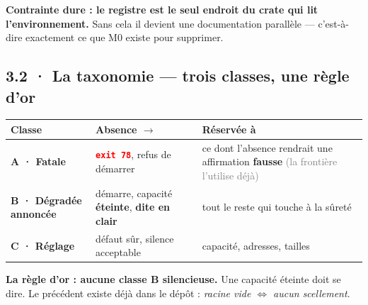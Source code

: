 \documentclass[10pt]{article}
\newcommand{\pire}[1]{\textcolor{red}{\textbf{#1}}}
\newcommand{\sz}[1]{\textcolor{grey}{\small\textsf{#1}}}
\newcommand{\code}[1]{\texttt{\small #1}}
\newcommand{\fl}{$\rightarrow$}
\begin{document}
\begin{alerte}
\textbf{Contrainte dure : le registre est le seul endroit du crate qui lit l'environnement.} Sans
cela il devient une documentation parallèle --- c'est-à-dire exactement ce que M0 existe pour
supprimer.
\end{alerte}

\subsection{3.2 · La taxonomie --- trois classes, une règle d'or}

\begin{center}\small
\begin{tabular}{@{}>{\raggedright\arraybackslash}p{3.4cm} >{\raggedright\arraybackslash}p{4.6cm} >{\raggedright\arraybackslash}p{7.6cm}@{}}
\toprule
\textbf{Classe} & \textbf{Absence \fl{}} & \textbf{Réservée à} \\
\midrule
\textbf{A · Fatale} & \pire{\code{exit 78}}, refus de démarrer & ce dont l'absence rendrait une affirmation \textbf{fausse} \sz{(la frontière l'utilise déjà)} \\
\textbf{B · Dégradée annoncée} & démarre, capacité \textbf{éteinte}, \textbf{dite en clair} & tout le reste qui touche à la sûreté \\
\textbf{C · Réglage} & défaut sûr, silence acceptable & capacité, adresses, tailles \\
\bottomrule
\end{tabular}
\end{center}

\begin{acquis}
\textbf{La règle d'or : aucune classe B silencieuse.} Une capacité éteinte doit se dire. Le
précédent existe déjà dans le dépôt : \emph{racine vide $\Leftrightarrow$ aucun scellement}.
\end{acquis}
\end{document}

